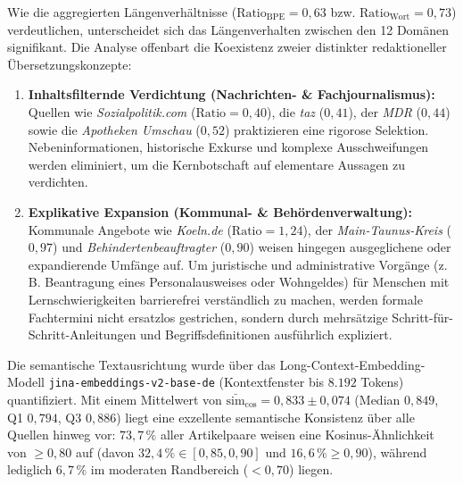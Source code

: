 Wie die aggregierten Längenverhältnisse ($\text{Ratio}_{\text{BPE}} = 0{,}63$ bzw. $\text{Ratio}_{\text{Wort}} = 0{,}73$) verdeutlichen, unterscheidet sich das Längenverhalten zwischen den 12 Domänen signifikant. Die Analyse offenbart die Koexistenz zweier distinkter redaktioneller Übersetzungskonzepte:
\begin{enumerate}
    \item \textbf{Inhaltsfilternde Verdichtung (Nachrichten- \& Fachjournalismus):} Quellen wie \textit{Sozialpolitik.com} ($\text{Ratio} = 0{,}40$), die \textit{taz} ($0{,}41$), der \textit{MDR} ($0{,}44$) sowie die \textit{Apotheken Umschau} ($0{,}52$) praktizieren eine rigorose Selektion. Nebeninformationen, historische Exkurse und komplexe Ausschweifungen werden eliminiert, um die Kernbotschaft auf elementare Aussagen zu verdichten.
    \item \textbf{Explikative Expansion (Kommunal- \& Behördenverwaltung):} Kommunale Angebote wie \textit{Koeln.de} ($\text{Ratio} = 1{,}24$), der \textit{Main-Taunus-Kreis} ($0{,}97$) und \textit{Behindertenbeauftragter} ($0{,}90$) weisen hingegen ausgeglichene oder expandierende Umfänge auf. Um juristische und administrative Vorgänge (z.\,B. Beantragung eines Personalausweises oder Wohngeldes) für Menschen mit Lernschwierigkeiten barrierefrei verständlich zu machen, werden formale Fachtermini nicht ersatzlos gestrichen, sondern durch mehrsätzige Schritt-für-Schritt-Anleitungen und Begriffsdefinitionen ausführlich expliziert.
\end{enumerate}

Die semantische Textausrichtung wurde über das Long-Context-Embedding-Modell \texttt{jina-embeddings-v2-base-de} (Kontextfenster bis $8.192$ Tokens) quantifiziert. Mit einem Mittelwert von $\bar{\text{sim}}_{\cos} = 0{,}833 \pm 0{,}074$ (Median $0{,}849$, Q1 $0{,}794$, Q3 $0{,}886$) liegt eine exzellente semantische Konsistenz über alle Quellen hinweg vor: $73{,}7\,\%$ aller Artikelpaare weisen eine Kosinus-Ähnlichkeit von $\ge 0{,}80$ auf (davon $32{,}4\,\% \in [0{,}85, 0{,}90]$ und $16{,}6\,\% \ge 0{,}90$), während lediglich $6{,}7\,\%$ im moderaten Randbereich ($< 0{,}70$) liegen.

